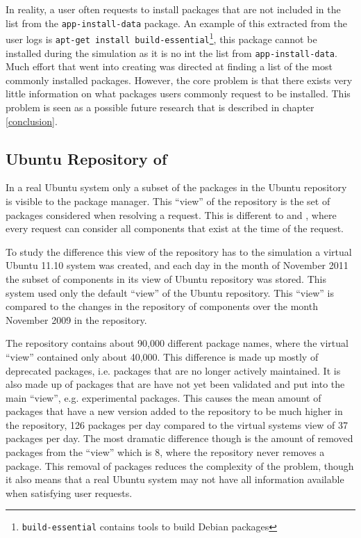 In reality, a user often requests to install packages that are not included in the list from the \texttt{app-install-data} package. 
An example of this extracted from the user logs is \texttt{apt-get install build-essential}\footnote{\texttt{build-essential} contains tools to build Debian packages},
this package cannot be installed during the simulation as it is no int the list from  \texttt{app-install-data}.
Much effort that went into creating \usermodel was directed at finding a list of the most commonly installed packages.
However, the core problem is that there exists very little information on what packages users commonly request to be installed.
This problem is seen as a possible future research that is described in chapter \ref{conclusion}. 

\subsection{Ubuntu Repository of \usermodel}
In a real Ubuntu system only a subset of the packages in the Ubuntu repository is visible to the package manager.
This ``view'' of the repository is the set of packages considered when resolving a request.
This is different to \modelname and \usermodel, 
where every request can consider all components that exist at the time of the request. 

To study the difference this view of the repository has to the simulation a virtual Ubuntu 11.10 system was created, 
and each day in the month of November 2011 the subset of components in its view of Ubuntu repository was stored.
This system used only the default ``view'' of the Ubuntu repository.
This ``view'' is compared to the changes in the repository of components over the month November 2009 in the \usermodel repository.

The \usermodel repository contains about 90,000 different package names, where the virtual ``view'' contained only about 40,000.
This difference is made up mostly of deprecated packages, i.e. packages that are no longer actively maintained.
It is also made up of packages that are have not yet been validated and put into the main ``view'', e.g. experimental packages. 
This causes the mean amount of packages that have a new version added to the repository to be much higher in the \usermodel repository,
126 packages per day compared to the virtual systems view of 37 packages per day.
The most dramatic difference though is the amount of removed packages from the ``view'' which is 8, where the \usermodel repository never removes a package.
This removal of packages reduces the complexity of the problem, 
though it also means that a real Ubuntu system may not have all information available when satisfying user requests. 

